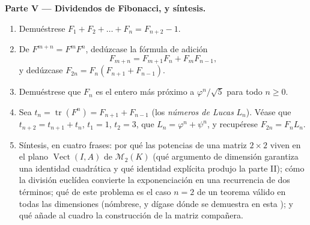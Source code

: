 \begin{problem}
\medskip
\noindent\textbf{Parte V --- Dividendos de Fibonacci, y síntesis.}
\begin{enumerate}[resume]
  \item Demuéstrese $F_1 + F_2 + \dots + F_n = F_{n+2} - 1$.
  \item De $F^{m+n} = F^m F^n$, dedúzcase la fórmula de adición
        \[
        F_{m+n} = F_{m+1}F_n + F_m F_{n-1},
        \]
        y dedúzcase $F_{2n} = F_n(F_{n+1} + F_{n-1})$.
  \item Demuéstrese que $F_n$ es el entero más próximo a
        $\varphi^n/\sqrt5$ para todo $n \geq 0$.
  \item Sea $t_n = \operatorname{tr}(F^n) = F_{n+1} + F_{n-1}$ (los
        \emph{números de Lucas} $L_n$). Véase que
        $t_{n+2} = t_{n+1} + t_n$, $t_1 = 1$, $t_2 = 3$, que
        $L_n = \varphi^n + \psi^n$, y recupérese $F_{2n} = F_n L_n$.
  \item Síntesis, en cuatro frases: por qué las potencias de una
        matriz $2 \times 2$ viven en el plano
        $\operatorname{Vect}(I, A)$ de $\mathcal{M}_2(K)$ (qué
        argumento de dimensión garantiza una identidad cuadrática y
        qué identidad explícita produjo la parte II); cómo la
        división euclídea convierte la exponenciación en una
        recurrencia de dos términos; qué  de este problema
        es el caso $n = 2$ de un teorema válido en todas las
        dimensiones (nómbrese, y dígase dónde se demuestra en esta
        ); y qué añade al cuadro la construcción de la matriz
        compañera.
\end{enumerate}
\end{problem}
